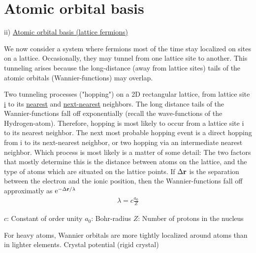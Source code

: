 
\section{Atomic orbital basis}

\noindent ii) \uline{Atomic orbital basis (lattice fermions)}

\noindent We now consider a system where fermions most of the time stay localized on sites on a lattice. Occasionally, they may tunnel from one lattice site to another. This tunneling arises because the long-distance (away from lattice sites) tails of the atomic orbitals (Wannier-functions) may overlap.

\begin{center}
\end{center}
\noindent Two tunneling processes ("hopping") on a 2D rectangular lattice, from lattice site \uline{i} to its \uline{nearest} and \uline{next-nearest} neighbors. The long distance tails of the Wannier-functions fall off exponentially (recall the wave-functions of the Hydrogen-atom). Therefore, hopping is most likely to occur from a lattice site i to its nearest neighbor. The next most probable hopping event is a direct hopping from i to its next-nearest neighbor, or two hopping via an intermediate nearest neighbor. Which process is most likely is a matter of some detail: The two factors that mostly determine this is the distance between atoms on the lattice, and the type of atoms which are situated on the lattice points. If $\Delta \vb{r}$ is the separation between the electron and the ionic position, then the Wannier-functions fall off approximatly as $\mathrm{e}^{-\Delta \vb{r}/\lambda}$
\begin{align*}
	\lambda = c \frac{a_0}{Z}
\end{align*}

\noindent $c$: Constant of order unity \newline
\noindent $a_0$: Bohr-radius\newline
\noindent $Z$: Number of protons in the nucleus\newline

\noindent For heavy atoms, Wannier orbitals are more tightly localized around atoms than in lighter elements. \newline
Crystal potential (rigid crystal) \newline

